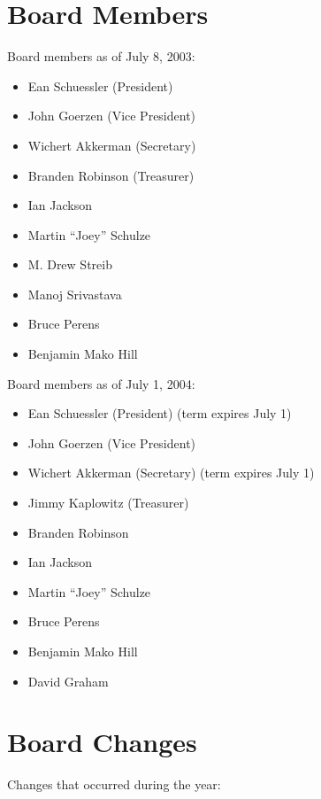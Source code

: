 \documentclass[letterpaper]{report}
\begin{document}
\section{Board Members}

Board members as of July 8, 2003:

\begin{itemize}
\item Ean Schuessler (President)
\item John Goerzen (Vice President)
\item Wichert Akkerman (Secretary)
\item Branden Robinson (Treasurer)
\item Ian Jackson
\item Martin ``Joey'' Schulze
\item M. Drew Streib
\item Manoj Srivastava
\item Bruce Perens
\item Benjamin Mako Hill
\end{itemize}

Board members as of July 1, 2004:

\begin{itemize}
\item Ean Schuessler (President) (term expires July 1)
\item John Goerzen (Vice President)
\item Wichert Akkerman (Secretary) (term expires July 1)
\item Jimmy Kaplowitz (Treasurer)
\item Branden Robinson
\item Ian Jackson
\item Martin ``Joey'' Schulze
\item Bruce Perens
\item Benjamin Mako Hill
\item David Graham
\end{itemize}

\section{Board Changes}

Changes that occurred during the year:
\end{document}

